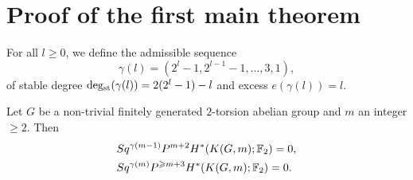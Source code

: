 \section{Proof of the first main theorem}\label{section:proof_first_main}

\begin{defn}
For all $l\geq0$, we define the admissible sequence 
$$\gamma(l)=(2^l-1,2^{l-1}-1,\dots,3,1),$$
of stable degree $\operatorname{deg_{st}}(\gamma(l))=2(2^l-1)-l$ and excess $e(\gamma(l))=l$.
\end{defn}

\begin{lem}\label{l:criminal}
Let $G$ be a non-trivial finitely generated $2$-torsion abelian group and $m$ an integer $\geq2$. Then
\begin{align*}
&Sq^{\gamma(m-1)}P^{m+2}H^*(K(G,m);\mathbb{F}_2)=0,\\
&Sq^{\gamma(m)}P^{\geqslant m+3}H^*(K(G,m);\mathbb{F}_2)=0.
\end{align*}
\end{lem}

